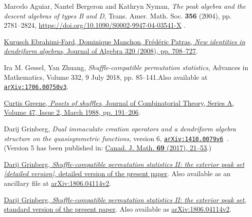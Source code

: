 \documentclass[numbers=enddot,12pt,final,onecolumn,notitlepage]{scrartcl}%
\theoremstyle{definition}
\newenvironment{verlong}{}{}
\newenvironment{vershort}{}{}
\begin{document}
\begin{thebibliography}{99999999}                                                                                         %


Marcelo Aguiar, Nantel Bergeron and Kathryn Nyman,
\textit{The peak algebra and the descent algebras of types B and D},
Trans. Amer. Math. Soc. \textbf{356} (2004), pp. 2781--2824,
\url{https://doi.org/10.1090/S0002-9947-04-03541-X} .

%
\href{https://doi.org/10.1016/j.jalgebra.2007.12.013}{Kurusch Ebrahimi-Fard,
Dominique Manchon, Fr\'{e}d\'{e}ric Patras, \textit{New identities in
dendriform algebras}, Journal of Algebra 320 (2008), pp. 708--727}.

Ira M. Gessel, Yan Zhuang, \textit{Shuffle-compatible
permutation statistics}, Advances in Mathematics, Volume 332, 9 July 2018, pp.
85--141.\newline Also available at
\texttt{\href{http://arxiv.org/abs/1706.00750v3}{arXiv:1706.00750v3}}.

%
\href{https://doi.org/10.1016/0097-3165(88)90018-0}{Curtis Greene,
\textit{Posets of shuffles}, Journal of Combinatorial Theory, Series A, Volume
47, Issue 2, March 1988, pp. 191--206}.

Darij Grinberg, \textit{Dual immaculate creation
operators and a dendriform algebra structure on the quasisymmetric functions},
version 6, \texttt{\href{https://arxiv.org/abs/1410.0079v6}{arXiv:1410.0079v6}%
}. (Version 5 has been published in:
\href{https://cms.math.ca/10.4153/CJM-2016-018-8?abfmt=ltx}{Canad. J. Math.
\textbf{69} (2017), 21--53}.)

\begin{vershort}


%
\href{http://www.cip.ifi.lmu.de/~grinberg/algebra/gzshuf2-long.pdf}{Darij
Grinberg, \textit{Shuffle-compatible permutation statistics II: the exterior
peak set [detailed version]}, detailed version of the present paper}. Also
available as an ancillary file at
\href{https://arxiv.org/abs/1806.04114v2}{arXiv:1806.04114v2}.
\end{vershort}

\begin{verlong}


%
\href{http://www.cip.ifi.lmu.de/~grinberg/algebra/gzshuf2.pdf}{Darij Grinberg,
\textit{Shuffle-compatible permutation statistics II: the exterior peak set},
standard version of the present paper}. Also available as
\href{https://arxiv.org/abs/1806.04114v2}{arXiv:1806.04114v2}.
\end{verlong}


\end{thebibliography}
\end{document}
